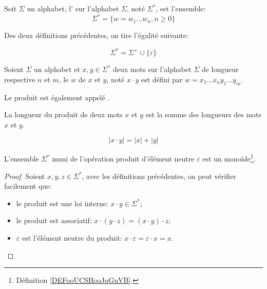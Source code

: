 \begin{definition}
	Soit \( \Sigma \) un alphabet, l' sur l'alphabet \( \Sigma \), noté \( \Sigma^* \), est l'ensemble:
	\begin{equation}
		\Sigma^* = \{ w = w_1 \ldots w_n, n \geq 0 \}
	\end{equation}
\end{definition}

Des deux définitions précédentes, on tire l'égalité suivante:

\begin{equation}
	\Sigma^* = \Sigma^+ \cup \{ \varepsilon \}
\end{equation}

\begin{definition}
	Soient \( \Sigma \) un alphabet et \( x, y \in \Sigma^* \) deux mots sur l'alphabet \( \Sigma \) de longueur respective \( n \) et \( m \), le  \( w \) de \( x \) et \( y \), noté \( x \cdot y \) est défini par \( w = x_1 \ldots x_n y_1 \ldots y_m \).
\end{definition}

Le produit est également appelé .

\begin{proposition}

	La longueur du produit de deux mots \( x \) et \( y \) est la somme des longueurs des mots \( x \) et \( y \).

	\begin{equation}
		|x \cdot y| = |x| + |y|
	\end{equation}
\end{proposition}


\begin{proposition}
	L'ensemble \( \Sigma^* \) muni de l'opération produit d'élément neutre \( \varepsilon \) est un monoïde\footnote{Définition \ref{DEFooUCSHooJqGuVB}.}.
\end{proposition}

\begin{proof}
	Soient \( x, y, z \in \Sigma^* \), avec les définitions précédentes, on peut vérifier facilement que:
	\begin{itemize}
		\item
		      le produit est une loi interne: \( x \cdot y \in \Sigma^*\);
		\item
		      le produit est associatif: \( x \cdot (y \cdot z) = (x \cdot y) \cdot z\);
		\item
		      \( \varepsilon\) est l'élément neutre du produit: \( x \cdot \varepsilon = \varepsilon \cdot x = x\).
	\end{itemize}
\end{proof}


